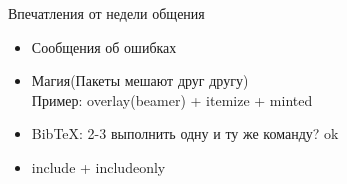 
\begin{frame}{Впечатления от недели общения}
  \begin{itemize}
    \pause
    \item Сообщения об ошибках
    \pause
    \item Магия(Пакеты мешают друг другу) \\
      Пример: overlay(beamer) + itemize + minted
    \pause  
    \item BibTeX: 2-3 выполнить одну и ту же команду? ok 
    \pause
    \item include + includeonly
  \end{itemize}
\end{frame}


